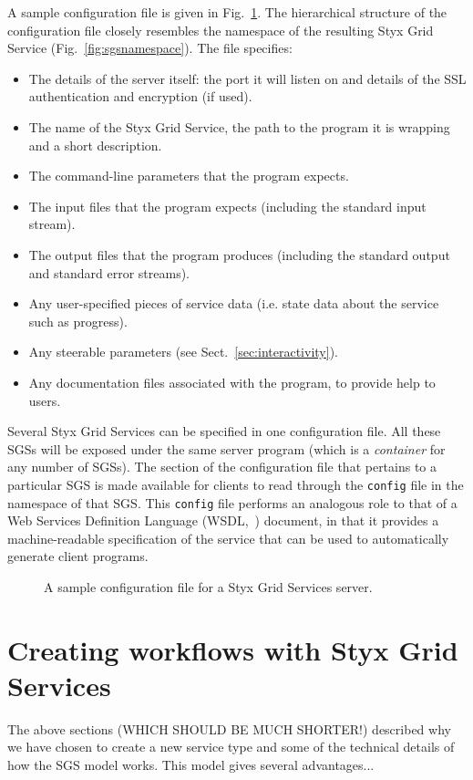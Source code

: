 \documentclass{llncs}
\begin{document}
A sample configuration file is given in Fig.~\ref{fig:configfile}.  The hierarchical structure of the configuration file closely resembles the namespace of the resulting Styx Grid Service (Fig.~\ref{fig:sgsnamespace}).  The file specifies:
\begin{itemize}
	\item The details of the server itself: the port it will listen on and details of the SSL authentication and encryption (if used).
	\item The name of the Styx Grid Service, the path to the program it is wrapping and a short description.
	\item The command-line parameters that the program expects.
	\item The input files that the program expects (including the standard input stream).
	\item The output files that the program produces (including the standard output and standard error streams).
	\item Any user-specified pieces of service data (i.e. state data about the service such as progress).
	\item Any steerable parameters (see Sect.~\ref{sec:interactivity}).
	\item Any documentation files associated with the program, to provide help to users.
\end{itemize}
Several Styx Grid Services can be specified in one configuration file.  All these SGSs will be exposed under the same server program (which is a {\em container\/} for any number of SGSs).  The section of the configuration file that pertains to a particular SGS is made available for clients to read through the {\tt config} file in the namespace of that SGS.  This {\tt config} file performs an analogous role to that of a Web Services Definition Language (WSDL,~\cite{WSDL}) document, in that it provides a machine-readable specification of the service that can be used to automatically generate client programs.

\begin{figure}
\caption{A sample configuration file for a Styx Grid Services server.}\label{fig:configfile}
\end{figure}
%
\section{Creating workflows with Styx Grid Services}
The above sections (WHICH SHOULD BE MUCH SHORTER!) described why we have chosen to create a new service type and some of the technical details of how the SGS model works.  This model gives several advantages...
\end{document}

